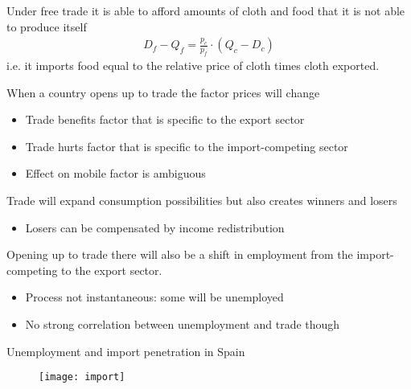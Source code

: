 \documentclass{beamer}
\begin{document}
\begin{frame}
 Under free trade it is able to afford amounts of cloth and food that it is not able to produce itself
  \begin{align*}
    D_f - Q_f = \frac{p_c}{p_f} \cdot (Q_c-D_c)
  \end{align*}
  \medskip
  i.e. it imports food equal to the relative price of cloth times cloth exported.
\end{frame}

\begin{frame}
  When a country opens up to trade the factor prices will change
  \begin{itemize}
    \item Trade benefits factor that is specific to the export sector
    \item Trade hurts factor that is specific to the import-competing sector
    \item Effect on mobile factor is ambiguous
  \end{itemize}
  \medskip
  Trade will expand consumption possibilities but also creates winners and losers
  \begin{itemize}
    \item Losers can be compensated by income redistribution
  \end{itemize}  
\end{frame}

\begin{frame}
Opening up to trade there will also be a shift in employment from the import-competing to the export sector.
\medskip
  \begin{itemize}
    \item Process not instantaneous: some will be unemployed
    \item No strong correlation between unemployment and trade though
  \end{itemize}
\end{frame}

\begin{frame}{Unemployment and import penetration in Spain}
  \begin{figure}
    \texttt{[image: import]}
  \end{figure}
\end{frame}
\end{document}
